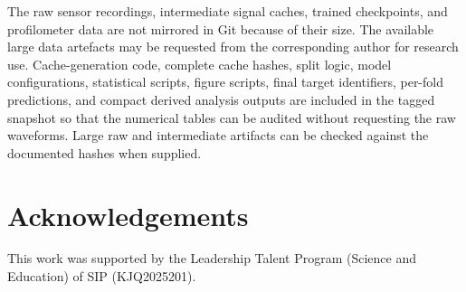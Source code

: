 The raw sensor recordings, intermediate signal caches, trained checkpoints,
and profilometer data are not mirrored in Git because of their size. The
available large data artefacts may be requested from the corresponding author
for research use. Cache-generation code, complete cache hashes, split logic,
model configurations, statistical scripts, figure scripts, final target
identifiers, per-fold predictions, and compact derived analysis outputs are
included in the tagged snapshot so that the numerical tables can be audited
without requesting the raw waveforms. Large raw and intermediate artifacts can
be checked against the documented hashes when supplied.





\section*{Acknowledgements}\label{acknowledgements}

This work was supported by the Leadership Talent Program (Science and
Education) of SIP (KJQ2025201).
